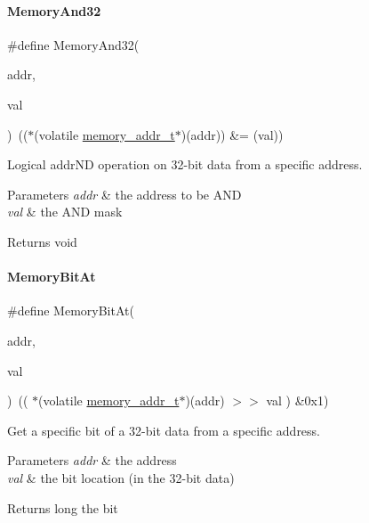 \paragraph{\texorpdfstring{Memory\+And32}{MemoryAnd32}}
{\footnotesize\ttfamily \#define Memory\+And32(\begin{DoxyParamCaption}\item[{}]{addr,  }\item[{}]{val }\end{DoxyParamCaption})~(($\ast$(volatile \mbox{\hyperlink{a00020_a06da901348542a481c297d9b700e2001}{memory\+\_\+addr\+\_\+t}}$\ast$)(addr)) \&= (val))}



Logical addr\+ND operation on 32-\/bit data from a specific address. 


\begin{DoxyParams}{Parameters}
{\em addr} & the address to be A\+ND \\
\hline
{\em val} & the A\+ND mask \\
\hline
\end{DoxyParams}
\begin{DoxyReturn}{Returns}
void 
\end{DoxyReturn}
\mbox{\label{a00020_afc530c7e6b49b0ca97c1ad9dac1c4750}} 
\paragraph{\texorpdfstring{Memory\+Bit\+At}{MemoryBitAt}}
{\footnotesize\ttfamily \#define Memory\+Bit\+At(\begin{DoxyParamCaption}\item[{}]{addr,  }\item[{}]{val }\end{DoxyParamCaption})~(( $\ast$(volatile \mbox{\hyperlink{a00020_a06da901348542a481c297d9b700e2001}{memory\+\_\+addr\+\_\+t}}$\ast$)(addr) $>$$>$ val ) \&0x1)}



Get a specific bit of a 32-\/bit data from a specific address. 


\begin{DoxyParams}{Parameters}
{\em addr} & the address \\
\hline
{\em val} & the bit location (in the 32-\/bit data) \\
\hline
\end{DoxyParams}
\begin{DoxyReturn}{Returns}
long the bit 
\end{DoxyReturn}
\mbox{\label{a00020_a04c34919a950117ae7da2dc5a235622b}} 

